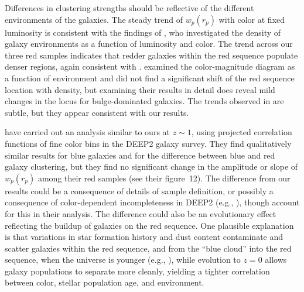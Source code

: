 \documentclass[]{emulateapj}
\newcommand{\wrp}{{w_p(r_p)}}
\begin{document}
Differences in clustering strengths should be reflective of the different
environments of the galaxies.
The steady trend of $\wrp$ with color at fixed luminosity
is consistent with the findings of \cite{hogg03}, who investigated
the density of galaxy environments as a function of luminosity and color.
The trend across our three red samples indicates that redder galaxies within 
the 
red sequence populate denser regions, again consistent with \citet{hogg03}.
\citet{hogg04} examined the color-magnitude diagram as a 
function of environment and did not find a significant shift of 
the red sequence location with density, but examining their results in detail 
does reveal mild changes in the locus for bulge-dominated galaxies.
The trends observed in \citet{hogg03,hogg04} are subtle, but they 
appear consistent with our results.

\citet{coil07} have carried out an analysis similar to ours at $z\sim 1$,
using projected correlation functions of fine color bins in the DEEP2
galaxy survey.  They find qualitatively similar results for blue galaxies
and for the difference between blue and red galaxy clustering,
but they find no significant change in the amplitude or slope of
$\wrp$ among their red samples (see their figure~12).  The difference
from our results could be a consequence of details of sample definition,
or possibly a consequence of color-dependent incompleteness in 
DEEP2 (e.g., \citealt{gerke07}), though \cite{coil07} account for this
in their analysis.  The difference could also be an evolutionary effect
reflecting the buildup of galaxies on the red sequence.
One plausible explanation is that variations in star formation history
and dust content contaminate and scatter galaxies within the red sequence,
and from the ``blue cloud'' into the red sequence,
when the universe is younger (e.g., \citealt{brammer09}), while evolution 
to $z=0$ allows galaxy populations to separate more cleanly, yielding a
tighter correlation between color, stellar population age, and environment.
\end{document}
